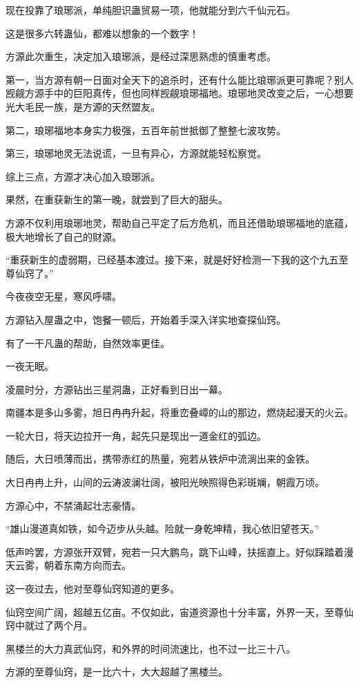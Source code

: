 \begin{this_body}
现在投靠了琅琊派，单纯胆识蛊贸易一项，他就能分到六千仙元石。

这是很多六转蛊仙，都难以想象的一个数字！

方源此次重生，决定加入琅琊派，是经过深思熟虑的慎重考虑。

第一，当方源有朝一日面对全天下的追杀时，还有什么能比琅琊派更可靠呢？别人觊觎方源手中的巨阳真传，但也同样觊觎琅琊福地。琅琊地灵改变之后，一心想要光大毛民一族，是方源的天然盟友。

第二，琅琊福地本身实力极强，五百年前世抵御了整整七波攻势。

第三，琅琊地灵无法说谎，一旦有异心，方源就能轻松察觉。

综上三点，方源才决心加入琅琊派。

果然，在重获新生的第一晚，就尝到了巨大的甜头。

方源不仅利用琅琊地灵，帮助自己平定了后方危机，而且还借助琅琊福地的底蕴，极大地增长了自己的财源。

“重获新生的虚弱期，已经基本渡过。接下来，就是好好检测一下我的这个九五至尊仙窍了。”

今夜夜空无星，寒风呼啸。

方源钻入屋蛊之中，饱餐一顿后，开始着手深入详实地查探仙窍。

有了一干凡蛊的帮助，自然效率更佳。

一夜无眠。

凌晨时分，方源钻出三星洞蛊，正好看到日出一幕。

南疆本是多山多雾，旭日冉冉升起，将重峦叠嶂的山的那边，燃烧起漫天的火云。

一轮大日，将天边拉开一角，起先只是现出一道金红的弧边。

随后，大日喷薄而出，携带赤红的热量，宛若从铁炉中流淌出来的金铁。

大日冉冉上升，山间的云涛波澜壮阔，被阳光映照得色彩斑斓，朝霞万顷。

方源心中，不禁涌起壮志豪情。

“雄山漫道真如铁，如今迈步从头越。险就一身乾坤精，我心依旧望苍天。”

低声吟罢，方源张开双臂，宛若一只大鹏鸟，跳下山峰，扶摇直上。好似踩踏着漫天云雾，朝着东南方向而去。

这一夜过去，他对至尊仙窍知道的更多。

仙窍空间广阔，超越五亿亩。不仅如此，宙道资源也十分丰富，外界一天，至尊仙窍中就过了两个月。

黑楼兰的大力真武仙窍，和外界的时间流速比，也不过一比三十八。

方源的至尊仙窍，是一比六十，大大超越了黑楼兰。


\end{this_body}
